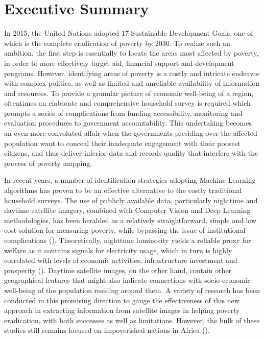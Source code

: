 \documentclass[solid,math,chem,code,plot,gloss]{bmc}
\begin{document}
\vfill


\vspace{3cm}

\newpage
\fancytoc{}

\chapter{Executive Summary}

In 2015, the United Nations adopted 17 Sustainable Development Goals, one of which is the complete eradication of poverty by 2030. To realize such an ambition, the first step is essentially to locate the areas most affected by poverty, in order to more effectively target aid, financial support and development programs. However, identifying areas of poverty is a costly and intricate endeavor with complex politics, as well as limited and unreliable availability of information and resources. To provide a granular picture of economic well-being of a region, oftentimes an elaborate and comprehensive household survey is required which prompts a series of complications from funding accessibility, monitoring and evaluation procedures to government accountability. This undertaking becomes an even more convoluted affair when the governments presiding over the affected population want to conceal their inadequate engagement with their poorest citizens, and thus deliver inferior data and records quality that interfere with the process of poverty mapping. 

In recent years, a number of identification strategies adopting Machine Learning algorithms has proven to be an effective alternative to the costly traditional household surveys. The use of publicly available data, particularly nighttime and daytime satellite imagery, combined with Computer Vision and Deep Learning methodologies, has been heralded as a relatively straightforward, simple and low cost solution for measuring poverty, while bypassing the issue of institutional complications (\cite{Neal_2016}). Theoretically, nighttime luminosity yields a reliable proxy for welfare as it contains signals for electricity usage, which in turn is highly correlated with levels of economic activities, infrastructure investment and prosperity (\cite{Gosh_2013}). Daytime satellite images, on the other hand, contain other geographical features that might also indicate connections with socio-economic well-being of the population residing around them. A variety of research has been conducted in this promising direction to gauge the effectiveness of this new approach in extracting information from satellite images in helping poverty eradication, with both successes as well as limitations. However, the bulk of these studies still remains focused on impoverished nations in Africa (\cite{Neal_2016, IFC_2019}). 
\end{document}
